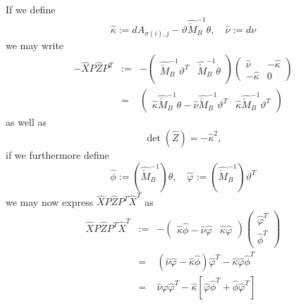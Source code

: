 \documentclass[a4paper]{article}
\begin{document}
If we define
\begin{equation}
\label{def:kappa_hat_nu_hat}
\hat{\kappa}:= dA_{\sigma(i),j}-\vartheta\hat{\check{M}}_{B}^{-1}\theta,
\quad
\hat{\nu}:=d\nu
\end{equation}
we may write
\begin{eqnarray}
-\hat{X}P\hat{Z}P^{T}
&:=&
-
\left(
\begin{array}{c|c}
\hat{\check{M}}_{B}^{-1}\vartheta^{T}
&
\hat{\check{M}}_{B}^{-1}\theta  \\
\end{array}
\right)
\left(
\begin{array}{c|c}
\hat{\nu}     & -\hat{\kappa} \\
\hline
-\hat{\kappa} & 0
\end{array}
\right)
\nonumber \\
&=&
\left(
\begin{array}{c|c}
\hat{\kappa}\hat{\check{M}}_{B}^{-1}\theta
-\hat{\nu}\hat{\check{M}}_{B}^{-1}\vartheta^{T}
&
\hat{\kappa}\hat{\check{M}}_{B}^{-1}\vartheta^{T}
\end{array}
\right)
\end{eqnarray}
as well as 
\begin{equation}
\det(\hat{Z})=-\hat{\kappa}^{2},
\end{equation}
if we furthermore define
\begin{equation}
\label{def:phi_hat_varphi_hat}
\hat{\phi}:=\left(\hat{\check{M}}_{B}^{-1}\right)\theta,
\quad
\hat{\varphi}:=\left(\hat{\check{M}}_{B}^{-1}\right)\vartheta^{T}
\end{equation}
we may now express $\hat{X}P\hat{Z}P^{T}\hat{X}^{T}$ as
\begin{eqnarray}
\hat{X}P\hat{Z}P^{T}\hat{X}^{T}
&:=&
-
\left(
\begin{array}{c|c}
\hat{\kappa}\hat{\phi}-\hat{\nu}\hat{\varphi}
&
\hat{\kappa}\hat{\varphi}
\end{array}
\right)
\left(
\begin{array}{c}
\hat{\varphi}^{T}  \\
\hline
\hat{\phi}^{T}
\end{array}
\right)
\nonumber \\
&=&
\left(
  \hat{\nu}\hat{\varphi}-\hat{\kappa}\hat{\phi}
\right)
\hat{\varphi}^{T}
-\hat{\kappa}\hat{\varphi}\hat{\phi}^{T}
\nonumber \\
&=&
\hat{\nu}\hat{\varphi}\hat{\varphi}^{T}
-\hat{\kappa}
 \left[
   \hat{\varphi}\hat{\phi}^{T}+\hat{\phi}\hat{\varphi}^{T}
 \right]
\end{eqnarray}
\end{document}
